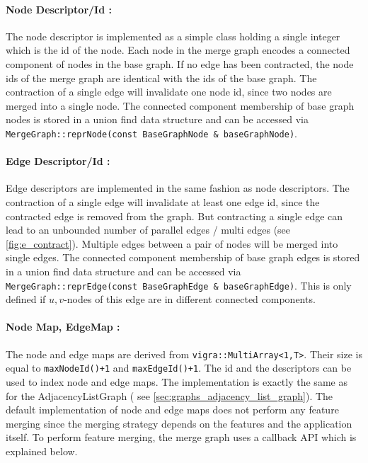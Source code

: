 \paragraph{Node Descriptor/Id :}
The node descriptor is implemented as a simple class
holding a single integer which is the id 
of the node.
Each node in the merge graph encodes a connected
component of nodes in the base graph.
If no edge has been contracted, the node ids
of the merge graph are identical with the ids 
of the base graph.
The contraction of a single edge will invalidate
one node id, since two nodes are merged into a single 
node.
The connected component membership of base graph
nodes is stored in a union find data structure 
and can be accessed via \lstinline{MergeGraph::reprNode(const BaseGraphNode & baseGraphNode)}.


\paragraph{Edge Descriptor/Id :}
Edge descriptors are implemented in the same fashion as node descriptors.
The contraction of a single edge will invalidate
at least one edge id, since the contracted edge is removed
from the graph.
But contracting a single edge can lead to an
unbounded number of parallel edges / multi edges (see \cref{fig:e_contract}).
Multiple edges between a pair of nodes will be merged
into single edges.
The connected component membership of base graph
edges is stored in a union find data structure 
and can be accessed via \lstinline{MergeGraph::reprEdge(const BaseGraphEdge & baseGraphEdge)}.
This is only defined if $u,v$-nodes of this edge are in different connected components.



\paragraph{Node Map, EdgeMap :} 
The node and edge maps are derived from \lstinline{vigra::MultiArray<1,T>}.
Their size is equal to \lstinline{maxNodeId()+1} and  \lstinline{maxEdgeId()+1}.
The id and the descriptors can be used to index node and edge maps.
The implementation is exactly the same as for the AdjacencyListGraph ( see \cref{sec:graphs_adjacency_list_graph}).
The default implementation of node and edge maps does not perform 
any feature merging since the merging strategy depends on the
features and the application itself.
To perform feature merging, the merge graph uses a callback API which is explained below.


